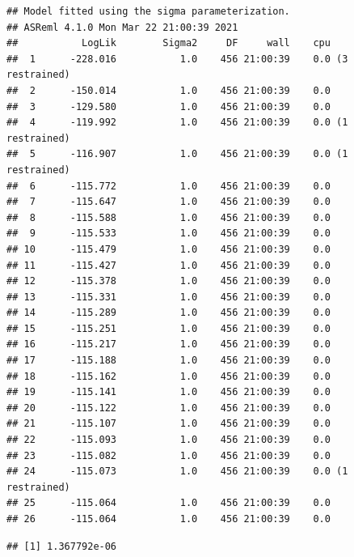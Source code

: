 \documentclass[
  12pt,
]{book}
\newenvironment{Shaded}{\begin{snugshade}}{\end{snugshade}}
\newcommand{\AttributeTok}[1]{\textcolor[rgb]{0.77,0.63,0.00}{#1}}
\newcommand{\ConstantTok}[1]{\textcolor[rgb]{0.00,0.00,0.00}{#1}}
\newcommand{\DecValTok}[1]{\textcolor[rgb]{0.00,0.00,0.81}{#1}}
\newcommand{\FunctionTok}[1]{\textcolor[rgb]{0.00,0.00,0.00}{#1}}
\newcommand{\NormalTok}[1]{#1}
\newcommand{\OtherTok}[1]{\textcolor[rgb]{0.56,0.35,0.01}{#1}}
\newcommand{\SpecialCharTok}[1]{\textcolor[rgb]{0.00,0.00,0.00}{#1}}
\newcommand{\StringTok}[1]{\textcolor[rgb]{0.31,0.60,0.02}{#1}}
\begin{document}
\begin{verbatim}
## Model fitted using the sigma parameterization.
## ASReml 4.1.0 Mon Mar 22 21:00:39 2021
##           LogLik        Sigma2     DF     wall    cpu
##  1      -228.016           1.0    456 21:00:39    0.0 (3 restrained)
##  2      -150.014           1.0    456 21:00:39    0.0
##  3      -129.580           1.0    456 21:00:39    0.0
##  4      -119.992           1.0    456 21:00:39    0.0 (1 restrained)
##  5      -116.907           1.0    456 21:00:39    0.0 (1 restrained)
##  6      -115.772           1.0    456 21:00:39    0.0
##  7      -115.647           1.0    456 21:00:39    0.0
##  8      -115.588           1.0    456 21:00:39    0.0
##  9      -115.533           1.0    456 21:00:39    0.0
## 10      -115.479           1.0    456 21:00:39    0.0
## 11      -115.427           1.0    456 21:00:39    0.0
## 12      -115.378           1.0    456 21:00:39    0.0
## 13      -115.331           1.0    456 21:00:39    0.0
## 14      -115.289           1.0    456 21:00:39    0.0
## 15      -115.251           1.0    456 21:00:39    0.0
## 16      -115.217           1.0    456 21:00:39    0.0
## 17      -115.188           1.0    456 21:00:39    0.0
## 18      -115.162           1.0    456 21:00:39    0.0
## 19      -115.141           1.0    456 21:00:39    0.0
## 20      -115.122           1.0    456 21:00:39    0.0
## 21      -115.107           1.0    456 21:00:39    0.0
## 22      -115.093           1.0    456 21:00:39    0.0
## 23      -115.082           1.0    456 21:00:39    0.0
## 24      -115.073           1.0    456 21:00:39    0.0 (1 restrained)
## 25      -115.064           1.0    456 21:00:39    0.0
## 26      -115.064           1.0    456 21:00:39    0.0
\end{verbatim}

\begin{Shaded}
\end{Shaded}

\begin{verbatim}
## [1] 1.367792e-06
\end{verbatim}

\begin{Shaded}
\end{Shaded}
\end{document}
